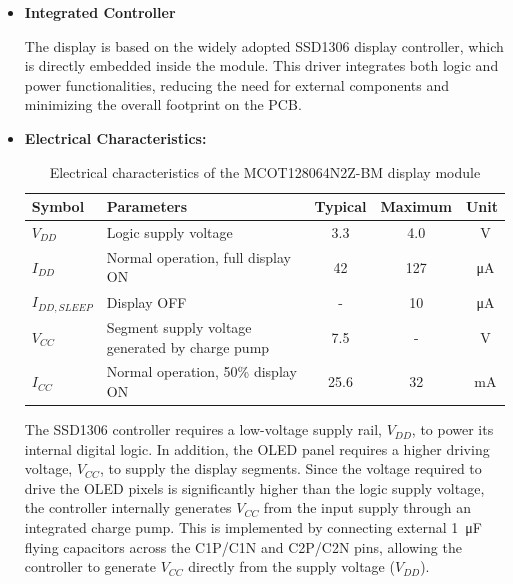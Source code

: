 \begin{itemize}

    \item \textbf{Integrated Controller}
    
    The display is based on the widely adopted SSD1306 display controller, which is directly embedded inside the module. This driver integrates both logic and power functionalities, reducing the need for external components and minimizing the overall footprint on the PCB.

    \item \textbf{Electrical Characteristics:}
    
    \begin{table}[H]
        \centering
        \renewcommand{\arraystretch}{1.3}
        \caption{Electrical characteristics of the MCOT128064N2Z-BM display module}
        \label{tab:oled_electrical}

        \begin{tabularx}{0.9\textwidth}{|l|X|c|c|c|}
            \hline
            \textbf{Symbol} &
            \textbf{Parameters} &
            \textbf{Typical} &
            \textbf{Maximum} &
            \textbf{Unit} \\
            \hline

            $V_{DD}$ & Logic supply voltage & 3.3 & 4.0 & \SI{}{\volt} \\
            \hline

            $I_{DD}$ & Normal operation, full display ON & 42 & 127 & \SI{}{\micro\ampere} \\
            \hline

            $I_{DD,SLEEP}$ & Display OFF & - & 10 & \SI{}{\micro\ampere} \\
            \hline

            $V_{CC}$ & Segment supply voltage generated by charge pump & 7.5 & - & \SI{}{\volt} \\
            \hline

            $I_{CC}$ & Normal operation, 50\% display ON & 25.6 & 32 & \SI{}{\milli\ampere} \\
            \hline

        \end{tabularx}
    \end{table}
    The SSD1306 controller requires a low-voltage supply rail, $V_{DD}$, to power its internal digital logic. In addition, the OLED panel requires a higher driving voltage, $V_{CC}$, to supply the display segments. Since the voltage required to drive the OLED pixels is significantly higher than the logic supply voltage, the controller internally generates $V_{CC}$ from the input supply through an integrated charge pump. This is implemented by connecting external \SI{1}{\micro\farad} flying capacitors across the C1P/C1N and C2P/C2N pins, allowing the controller to generate $V_{CC}$ directly from the supply voltage ($V_{DD}$).


\end{itemize}
